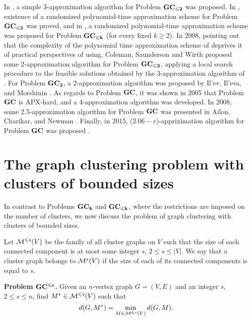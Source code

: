 \documentclass[runningheads]{llncs}
\begin{document}
In \cite{bbc04},
a simple 3-approximation algorithm for Problem ${\bf GC_{\leqslant 2}}$ 
was proposed. In \cite{aikt06}, existence of a randomized polynomial-time 
approximation scheme for Problem ${\bf GC_{\leqslant 2}}$ was proved, 
and in \cite{gg06}, a randomized polynomial-time approximation
scheme was proposed for Problem ${\bf GC_{\leqslant k}}$ (for every fixed 
${k \geqslant 2}$). In 2008, pointing out that the complexity of the polynomial
time approximation scheme of \cite{gg06}
deprives it of practical
perspectives of using, Coleman, Saunderson and Wirth \cite{csw08}
proposed some 2-approximation algorithm for Problem ${\bf GC_{\leqslant 2}}$, 
applying a local search procedure to the feasible solutions 
obtained by the 3-approximation algorithm of \cite{bbc04}.
For Problem ${\bf GC_2}$, 
a 2-approximation algorithm was proposed by Il'ev, Il'eva, and Morshinin 
\cite{iim19}.
As regards to Problem ${\bf GC}$, it was shown in 2005 \cite{cgw05}
that Problem ${\bf GC}$ 
is APX-hard, and a 4-approximation algorithm was developed. In
2008, some 2.5-approximation algorithm for Problem ${\bf GC}$ was
presented in Ailon, Charikar, and Newman \cite{acn08}.
Finally, in 2015, ($2.06 - \varepsilon$)-appriximation algorithm
for Problem ${\bf GC}$ was proposed \cite{cmsy15}.

\medskip

\section{The graph clustering problem with clusters of bounded sizes}

In contrast to Problems ${\bf GC_k}$ and ${\bf GC_{\leqslant k}}$, 
where the restrictions are imposed on
the number of clusters, we now discuss the problem of graph clustering
with clusters of bounded sizes. 

Let ${\cal M}^{\leqslant s}(V)$ be the family of all cluster graphs on $V$ such that 
the size of each connected component is at most some integer $s$,
${2\leqslant s \leq|V|}$. 
We say that a cluster graph belongs to
${\cal M}^s(V)$ if the size of each of its connected components is
equal to $s$.

{\bf Problem $\bf GC^{\leqslant s}$.} Given an $n$-vertex graph $G = (V,E)$
and an integer $s$, ${2\leqslant s \leqslant n}$, find $M^* \in {\cal M}^{\leqslant s}(V)$ 
such that
$$
 d(G,M^*)=\min_{M \in {\cal M}^{\leqslant s}(V)} d(G,M).
$$
\end{document}

